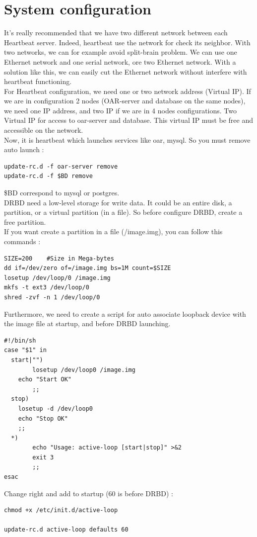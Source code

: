 \documentclass[a4paper,10pt]{report}
\begin{document}
\section{System configuration}
It's really recommended that we have two different network between each Heartbeat server. Indeed, heartbeat use the network for check its neighbor. With two networks, we can for example avoid split-brain problem. We can use one Ethernet network and one serial network, ore two Ethernet network. With a solution like this, we can easily cut the Ethernet network without interfere with heartbeat functioning.\\
For Heartbeat configuration, we need one or two network address (Virtual IP). If we are in configuration 2 nodes (OAR-server and database on the same nodes), we need one IP address, and two IP if we are in 4 nodes configurations. Two Virtual IP for access to oar-server and database. This virtual IP must be free and accessible on the network.\\

Now, it is heartbeat which launches services like oar, mysql. So you must remove auto launch :
\begin{lstlisting}
update-rc.d -f oar-server remove
update-rc.d -f $BD remove
\end{lstlisting}
\$BD correspond to mysql or postgres.\\

DRBD need a low-level storage for write data. It could be an entire disk, a partition, or a virtual partition (in a file). So before configure DRBD, create a free partition.\\
If you want create a partition in a file (/image.img), you can follow this commands :
\begin{lstlisting}
SIZE=200	#Size in Mega-bytes
dd if=/dev/zero of=/image.img bs=1M count=$SIZE
losetup /dev/loop/0 /image.img
mkfs -t ext3 /dev/loop/0
shred -zvf -n 1 /dev/loop/0	
\end{lstlisting}
Furthermore, we need to create a script for auto associate loopback device with the image file at startup, and before DRBD launching.
\begin{lstlisting}
#!/bin/sh
case "$1" in
  start|"") 
        losetup /dev/loop0 /image.img
	echo "Start OK"
        ;;
  stop)
	losetup -d /dev/loop0
	echo "Stop OK"
	;;
  *)
        echo "Usage: active-loop [start|stop]" >&2
        exit 3
        ;;
esac
\end{lstlisting}
Change right and add to startup (60 is before DRBD) :
\begin{lstlisting}
chmod +x /etc/init.d/active-loop

update-rc.d active-loop defaults 60
\end{lstlisting}
\end{document}
